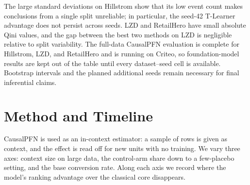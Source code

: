 \documentclass[twocolumn]{style}
\begin{document}
\begin{table}[!htpb]
    \caption{Normalized Qini AUC over test splits for seeds 0--4, reported as mean $\pm$ sample
    standard deviation. Hyperparameters are fixed from seed-42 validation selection. Higher is
    better; the highest mean in each dataset is bold.}
    \label{tab:baseline-qini-multiseed}
    \centering
    \small
\end{table}

The large standard deviations on Hillstrom show that its low event count makes conclusions from a
single split unreliable; in particular, the seed-42 T-Learner advantage does not persist across
seeds. LZD and RetailHero have small absolute Qini values, and the gap between the best two methods
on LZD is negligible relative to split variability. The full-data CausalPFN evaluation is complete
for Hillstrom, LZD, and RetailHero and is running on Criteo, so foundation-model results are kept out
of the table until every dataset--seed cell is available. Bootstrap intervals and the planned
additional seeds remain necessary for final inferential claims.

\section{Method and Timeline}
CausalPFN is used as an in-context estimator: a sample of rows is given as context, and the effect is
read off for new units with no training. We vary three axes: context size on large data, the
control-arm share down to a few-placebo setting, and the base conversion rate. Along each axis we
record where the model's ranking advantage over the classical core disappears.
\end{document}
